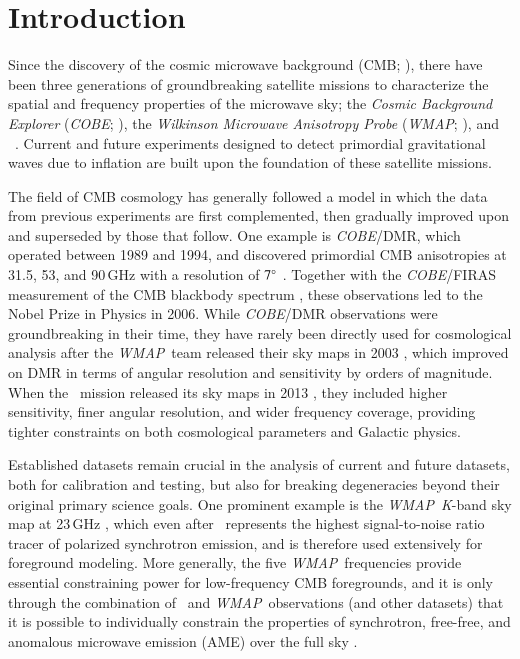 \documentclass[twocolumn]{aa}
\def\WMAP{\emph{WMAP}}
\def\COBE{\emph{COBE}}
\newcommand{\K}[0]{\textit K}
\begin{document}




\section{Introduction}
\label{sec:introduction}

Since the discovery of the cosmic microwave background (CMB;
\citealp{penzias:1965}), there have been three generations of groundbreaking
satellite missions to characterize the spatial and frequency properties of the
microwave sky; the \textit{Cosmic Background Explorer} (\textit{COBE};
\citealp{smoot:1992,mather:1994}), the \textit{Wilkinson Microwave Anisotropy
Probe} (\WMAP; \citealp{bennett2012}), and \Planck\ \citep{planck2016-l01}.
Current and future experiments designed to detect primordial gravitational
waves due to inflation \citep[e.g.,][and references therein]{kamionkowski:2016}
are built upon the foundation of these satellite missions.

The field of CMB cosmology has generally followed a model in which the data
from previous experiments are first complemented, then gradually improved upon
and superseded by those that follow. One example is \textit{COBE}/DMR, which
operated between 1989 and 1994, and discovered primordial CMB anisotropies at
31.5, 53, and 90\,GHz with a resolution of $7^\circ$ \citep{smoot:1992}.
Together with the \COBE/FIRAS measurement of the CMB blackbody spectrum
\citep{mather:1994}, these observations led to the Nobel Prize in Physics in
2006. While \COBE/DMR observations were groundbreaking in their time, they have
rarely been directly used for cosmological analysis after the \WMAP\ team
released their sky maps in 2003 \citep{bennett2003a}, which improved on DMR in
terms of angular resolution and sensitivity by orders of magnitude.  When the
\Planck\ mission released its sky maps in 2013 \citep{planck2013-p01}, they
included higher sensitivity, finer angular resolution, and wider frequency
coverage, providing tighter constraints on both cosmological parameters and
Galactic physics.

Established datasets remain crucial in the analysis of current and future
datasets, both for calibration and testing, but also for breaking degeneracies
beyond their original primary science goals.  One prominent example is the
\WMAP\ \K-band sky map at 23\,GHz \citep{bennett2012}, which even after
\Planck\ represents the highest signal-to-noise ratio tracer of polarized
synchrotron emission, and is therefore used extensively for foreground
modeling. More generally, the five \WMAP\ frequencies provide essential
constraining power for low-frequency CMB foregrounds, and it is only through
the combination of \Planck\ and \WMAP\ observations (and other datasets) that
it is possible to individually constrain the properties of synchrotron,
free-free, and anomalous microwave emission (AME) over the full sky
\citep[e.g.,][]{planck2014-a12,bp13}.
\end{document}
